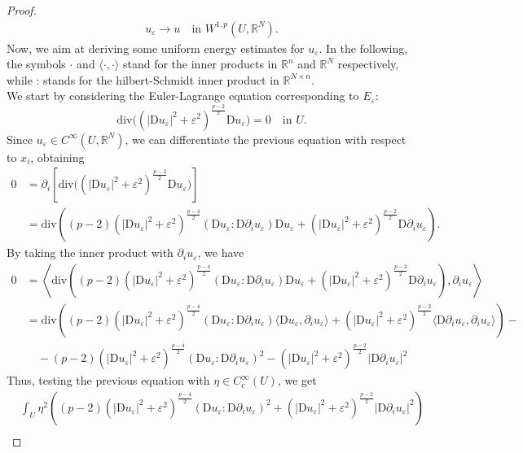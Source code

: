 \documentclass[a4paper,11pt]{article}
\numberwithin{equation}{section}
\newcommand{\numberset}{\mathbb}
\newcommand{\eps}{\varepsilon}
\newcommand{\R}{\numberset{R}}
\newcommand{\rom}{\mathrm}
\theoremstyle{definition}
\begin{document}
\begin{proof}
\begin{align}
u_\eps\to u\quad\mbox{in }W^{1,p}(U,\R^N).
\end{align} 
Now, we aim at deriving some uniform energy estimates for $u_\eps$.
 In the following, the symbols $\cdot$ and $ \langle\cdot,\cdot\rangle$ stand for the inner products in $\R^n$ and $\R^N$ respectively, while : stands for the hilbert-Schmidt inner product in $\R^{N\times n}$.\\
We start by considering the Euler-Lagrange equation corresponding to $E_\eps$:
$$
\rom{div}\big(\left(|\rom Du_\eps|^2+\eps^2\right)^{\frac{p-2}2}\rom Du_\eps\big)=0\quad\mbox{in }U.
$$
Since $u_\eps\in C^\infty(U,\R^N)$, we can differentiate the previous equation with respect to $x_i$, obtaining
\begin{align*}
0&=\partial_i\left[\rom{div}\big(\left(|\rom Du_\eps|^2+\eps^2\right)^{\frac{p-2}2}\rom Du_\eps\big)\right]\\
&=\rom{div}\left((p-2)\left(|\rom Du_\eps|^2+\eps^2\right)^{\frac{p-4}2}(\rom Du_\eps:\rom D\partial_i u_\eps)\rom Du_\eps+\left(|\rom Du_\eps|^2+\eps^2\right)^{\frac{p-2}2}\rom D\partial_iu_\eps\right).
\end{align*}
By taking the inner product with $\partial_i u_\eps$, we have
\begin{equation}\label{inner}
\begin{aligned}
0&=\left\langle\rom{div}\left((p-2)\left(|\rom Du_\eps|^2+\eps^2\right)^{\frac{p-4}2}(\rom Du_\eps:\rom D\partial_i u_\eps)\rom Du_\eps+\left(|\rom Du_\eps|^2+\eps^2\right)^{\frac{p-2}2}\rom D\partial_iu_\eps\right),\partial_iu_\eps\right\rangle\\
&=\rom{div}\left((p-2)\left(|\rom Du_\eps|^2+\eps^2\right)^{\frac{p-4}2}(\rom Du_\eps:\rom D\partial_i u_\eps)\langle\rom Du_\eps,\partial_iu_\eps\rangle+\left(|\rom Du_\eps|^2+\eps^2\right)^{\frac{p-2}2}\langle\rom D\partial _iu_\eps,\partial_iu_\eps\rangle\right)-\\
&\quad-(p-2)\left(|\rom Du_\eps|^2+\eps^2\right)^{\frac{p-4}2}(\rom Du_\eps:\rom D\partial_i u_\eps)^2-\left(|\rom Du_\eps|^2+\eps^2\right)^{\frac{p-2}2}|\rom D\partial_iu_\eps|^2
\end{aligned}
\end{equation}
Thus, testing the previous equation with $\eta\in C^\infty_c(U)$, we get
\begin{equation}\label{test}
\begin{aligned}
&\int_U\eta^2\left((p-2)\left(|\rom Du_\eps|^2+\eps^2\right)^{\frac{p-4}2}(\rom Du_\eps:\rom D\partial_i u_\eps)^2+\left(|\rom Du_\eps|^2+\eps^2\right)^{\frac{p-2}2}|\rom D\partial_iu_\eps|^2\right)\\

\end{aligned}
\end{equation}
\end{proof}
\end{document}
